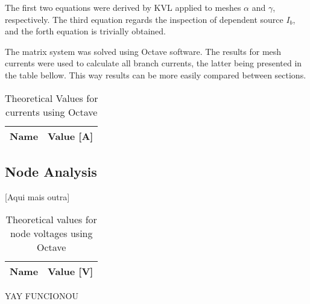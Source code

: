 \par The first two equations were derived by KVL applied to meshes $\alpha$ and $\gamma$, respectively. The third equation regards the inspection of dependent source $I_b$, and the forth equation is trivially obtained.

\par The matrix system was solved using Octave software. The results for mesh currents were used to calculate all branch currents, the latter being presented in the table bellow. This way results can be more easily compared between sections.



\begin{table}[H]
  \centering
  \begin{tabular}{|l|r|}
    \hline
    {\bf Name} & {\bf Value [A]} \\ \hline
    
  \end{tabular}
  \caption{Theoretical Values for currents using Octave}
  \label{tab:TCurrents}
\end{table}

\subsection{Node Analysis}
[Aqui mais outra]

\begin{table}[H]
  \centering
  \begin{tabular}{|l|r|}
    \hline
    {\bf Name} & {\bf Value [V]} \\ \hline
    
  \end{tabular}
  \caption{Theoretical values for node voltages using Octave}
  \label{tab:TVoltages}
\end{table}

YAY FUNCIONOU
